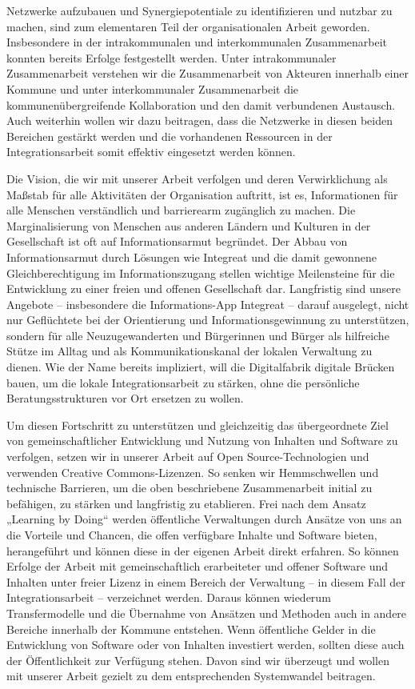 \documentclass[12pt, a4paper]{article} %
\begin{document}
Netzwerke aufzubauen und Synergiepotentiale zu identifizieren und
nutzbar zu machen, sind zum elementaren Teil der organisationalen Arbeit
geworden. Insbesondere in der intrakommunalen und interkommunalen
Zusammenarbeit konnten bereits Erfolge festgestellt werden. Unter
intrakommunaler Zusammenarbeit verstehen wir die Zusammenarbeit von
Akteuren innerhalb einer Kommune und unter interkommunaler
Zusammenarbeit die kommunenübergreifende Kollaboration und den damit
verbundenen Austausch. Auch weiterhin wollen wir dazu beitragen, dass
die Netzwerke in diesen beiden Bereichen gestärkt werden und die
vorhandenen Ressourcen in der Integrationsarbeit somit effektiv
eingesetzt werden können.

Die Vision, die wir mit unserer Arbeit verfolgen und deren
Verwirklichung als Maßstab für alle Aktivitäten der Organisation
auftritt, ist es, Informationen für alle Menschen verständlich und
barrierearm zugänglich zu machen. Die Marginalisierung von Menschen aus
anderen Ländern und Kulturen in der Gesellschaft ist oft auf
Informationsarmut begründet. Der Abbau von Informationsarmut durch
Lösungen wie Integreat und die damit gewonnene Gleichberechtigung im
Informationszugang stellen wichtige Meilensteine für die Entwicklung zu
einer freien und offenen Gesellschaft dar. Langfristig sind unsere
Angebote – insbesondere die Informations-App Integreat – darauf
ausgelegt, nicht nur Geflüchtete bei der Orientierung und
Informationsgewinnung zu unterstützen, sondern für alle Neuzugewanderten
und Bürgerinnen und Bürger als hilfreiche Stütze im Alltag und als
Kommunikationskanal der lokalen Verwaltung zu dienen. Wie der Name
bereits impliziert, will die Digitalfabrik digitale Brücken bauen, um
die lokale Integrationsarbeit zu stärken, ohne die persönliche
Beratungsstrukturen vor Ort ersetzen zu wollen.

Um diesen Fortschritt zu unterstützen und gleichzeitig das übergeordnete
Ziel von gemeinschaftlicher Entwicklung und Nutzung von Inhalten und
Software zu verfolgen, setzen wir in unserer Arbeit auf Open
Source-Technologien und verwenden Creative Commons-Lizenzen. So senken
wir Hemmschwellen und technische Barrieren, um die oben beschriebene
Zusammenarbeit initial zu befähigen, zu stärken und langfristig zu
etablieren. Frei nach dem Ansatz „Learning by Doing“ werden öffentliche
Verwaltungen durch Ansätze von uns an die Vorteile und Chancen, die
offen verfügbare Inhalte und Software bieten, herangeführt und können
diese in der eigenen Arbeit direkt erfahren. So können Erfolge der
Arbeit mit gemeinschaftlich erarbeiteter und offener Software und
Inhalten unter freier Lizenz in einem Bereich der Verwaltung – in diesem
Fall der Integrationsarbeit – verzeichnet werden. Daraus können wiederum
Transfermodelle und die Übernahme von Ansätzen und Methoden auch in
andere Bereiche innerhalb der Kommune entstehen. Wenn öffentliche Gelder
in die Entwicklung von Software oder von Inhalten investiert werden,
sollten diese auch der Öffentlichkeit zur Verfügung stehen. Davon sind
wir überzeugt und wollen mit unserer Arbeit gezielt zu dem
entsprechenden Systemwandel beitragen.
\end{document}
